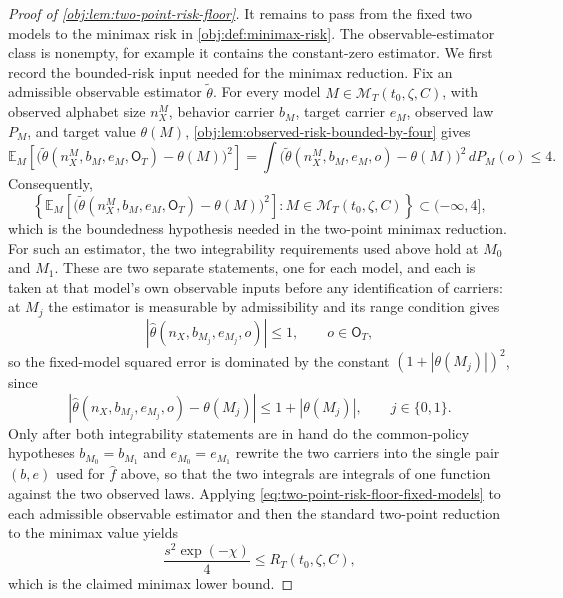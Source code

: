 \begin{proof}[Proof of \cref{obj:lem:two-point-risk-floor}]
It remains to pass from the fixed two models to the minimax risk in
\cref{obj:def:minimax-risk}.  The observable-estimator class is nonempty, for
example it contains the constant-zero estimator.  We first record the bounded-risk input needed for the minimax reduction.  Fix an admissible observable estimator \(\widetilde\theta\).  For every model
\(M\in\mathcal M_T(t_0,\zeta,C)\), with observed alphabet size \(n_X^M\), behavior carrier \(b_M\), target carrier \(e_M\), observed law \(P_M\), and target value \(\theta(M)\), \cref{obj:lem:observed-risk-bounded-by-four} gives
\[
\mathbb E_M\!\left[
\bigl(\widetilde\theta(n_X^M,b_M,e_M,\mathsf O_T)-\theta(M)\bigr)^2
\right]
=
\int\bigl(\widetilde\theta(n_X^M,b_M,e_M,o)-\theta(M)\bigr)^2\,dP_M(o)
\le 4.
\]
Consequently,
\[
\left\{
\mathbb E_M\!\left[
\bigl(\widetilde\theta(n_X^M,b_M,e_M,\mathsf O_T)-\theta(M)\bigr)^2
\right]:
M\in\mathcal M_T(t_0,\zeta,C)
\right\}
\subset (-\infty,4],
\]
which is the boundedness hypothesis needed in the two-point minimax reduction. %
For such an estimator, the two integrability requirements used above hold at
\(M_0\) and \(M_1\).  These are two separate statements, one for each model, and
each is taken at that model's own observable inputs before any identification of
carriers: at \(M_j\) the estimator is measurable by admissibility and its range
condition gives
\[
|\widehat\theta(n_X,b_{M_j},e_{M_j},o)|\le 1,
\qquad o\in\mathsf O_T,
\]
so the fixed-model squared error is dominated by the constant
\((1+|\theta(M_j)|)^2\), since
\[
|\widehat\theta(n_X,b_{M_j},e_{M_j},o)-\theta(M_j)|
\le
1+|\theta(M_j)|,
\qquad j\in\{0,1\}.
\]
Only after both integrability statements are in hand do the common-policy
hypotheses \(b_{M_0}=b_{M_1}\) and \(e_{M_0}=e_{M_1}\) rewrite the two carriers
into the single pair \((b,e)\) used for \(\widehat f\) above, so that the two
integrals are integrals of one function against the two observed laws.
Applying \cref{eq:two-point-risk-floor-fixed-models} to each admissible observable estimator and then the standard
two-point reduction to the minimax value yields
\[
\frac{s^2\exp(-\chi)}{4}
\le
R_T(t_0,\zeta,C),
\]
which is the claimed minimax lower bound. %
\end{proof}
